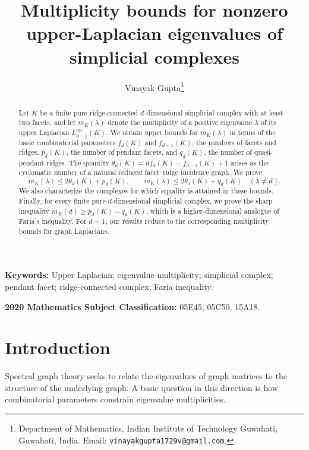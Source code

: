 \documentclass[12pt]{article}
\theoremstyle{remark}
\begin{document}
\title{Multiplicity bounds for nonzero upper-Laplacian eigenvalues of simplicial complexes}

\author{Vinayak Gupta\thanks{Department of Mathematics, Indian Institute of
Technology Guwahati, Guwahati, India. Email:
\texttt{vinayakgupta1729v@gmail.com}.}}
\date{}


\maketitle

\begin{abstract}
Let $K$ be a finite pure ridge-connected $d$-dimensional simplicial complex
with at least two facets, and let $m_K(\lambda)$ denote the multiplicity of a
positive eigenvalue $\lambda$ of its upper Laplacian
$L_{d-1}^{\mathrm{up}}(K)$.  We obtain upper bounds for $m_K(\lambda)$ in
terms of the basic combinatorial parameters $f_d(K)$ and $f_{d-1}(K)$, the
numbers of facets and ridges, $p_d(K)$, the number of pendant facets, and
$q_d(K)$, the number of quasi-pendant ridges.  The quantity
$\theta_d(K)=d f_d(K)-f_{d-1}(K)+1$ arises as the cyclomatic number of a
natural reduced facet--ridge incidence graph.  We prove
\[
m_K(\lambda)\le 2\theta_d(K)+p_d(K),
\qquad
m_K(\lambda)\le 2\theta_d(K)+q_d(K)\quad(\lambda\ne d).
\]
We also characterize the complexes for which equality is attained in these bounds.  Finally, for every finite pure $d$-dimensional simplicial complex, we prove the sharp inequality $m_K(d)\ge p_d(K)-q_d(K)$, which is a higher-dimensional analogue of Faria's inequality.  For $d=1$, our results reduce to the corresponding multiplicity bounds for graph Laplacians.
\end{abstract}

\medskip
\noindent\textbf{Keywords:} Upper Laplacian; eigenvalue multiplicity; simplicial complex; pendant facet; ridge-connected complex; Faria inequality.

\noindent\textbf{2020 Mathematics Subject Classification:} 05E45, 05C50, 15A18.

\section{Introduction}

Spectral graph theory seeks to relate the eigenvalues of graph matrices to the
structure of the underlying graph.  A basic question in this direction is how
combinatorial parameters constrain eigenvalue multiplicities.
\end{document}

